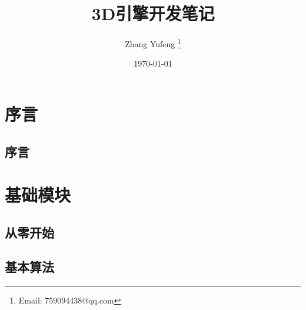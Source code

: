\documentclass[
    UTF8,       %
    b5paper,    %
    10pt,       %
    oneside,    %
    openright,  %
    titlepage,  %
    final       %
]{ctexbook}
\title{3D引擎开发笔记}
\author{ Zhang Yufeng \thanks{Email: 759094438@qq.com} }
\date{\today}
\begin{document}
    \maketitle
    \tableofcontents

    \frontmatter

    \maketitle
    \part{序言}

    \maketitle
    \chapter{序言}
    

    \mainmatter

    \maketitle
    \part{基础模块}

    \maketitle
    \chapter{从零开始}
    
    
    
    
    

    \maketitle
    \chapter{基本算法}
    
\end{document}
